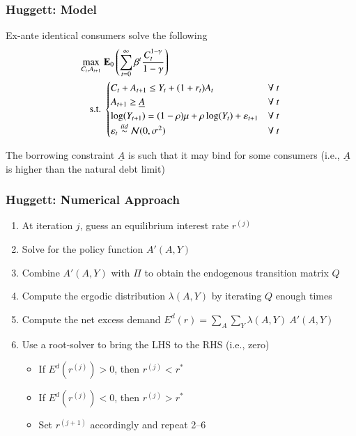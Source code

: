\documentclass[10pt, aspectratio=1610, natbib, handout]{beamer}
\begin{document}
  \begin{frame}
    \frametitle{Huggett: Model}

    Ex-ante identical consumers solve the following
    \begin{align*}
      \max_{C_t, A_{t+1}} &\; \mathbf{E}_0 \left( \sum_{t=0}^{\infty} \beta^t \frac{C_t^{1-\gamma}}{1-\gamma} \right) \\
      \text{s.t.} &\;
      \begin{cases}
        C_t + A_{t+1} \leq Y_t + (1 + r_t) A_t & \forall\ t \\
        A_{t+1} \geq \underline{A} & \forall\ t \\
        \log(Y_{t+1}) = (1 - \rho) \mu + \rho \log(Y_t) + \varepsilon_{t+1} & \forall\ t \\
        \varepsilon_{t} \overset{iid}{\sim} \mathcal{N}(0, \sigma^2) & \forall\ t
      \end{cases}
    \end{align*}

    \vfill\pause

    The borrowing constraint $\underline{A}$ is such that it may bind for some consumers (i.e., $\underline{A}$ is higher than the natural debt limit)

  \end{frame}

  \begin{frame}
    \frametitle{Huggett: Numerical Approach}

    \begin{enumerate}
      \item At iteration $j$, guess an equilibrium interest rate $r^{(j)}$
      \vfill\pause
      \item Solve for the policy function $A'(A, Y)$
      \vfill\pause
      \item Combine $A'(A, Y)$ with $\Pi$ to obtain the endogenous transition matrix $Q$
      \vfill\pause
      \item Compute the ergodic distribution $\lambda(A, Y)$ by iterating $Q$ enough times
      \vfill\pause
      \item Compute the net excess demand $E^d(r) = \sum_A \sum_Y \lambda(A, Y)\ A'(A, Y)$
      \vfill\pause
      \item Use a root-solver to bring the LHS to the RHS (i.e., zero)
        \begin{itemize}
          \item If $E^d \left( r^{(j)} \right) > 0$, then $r^{(j)} < r^*$
          \item If $E^d \left( r^{(j)} \right) < 0$, then $r^{(j)} > r^*$
          \item Set $r^{(j+1)}$ accordingly and repeat 2--6
        \end{itemize}
    \end{enumerate}

  \end{frame}
\end{document}
